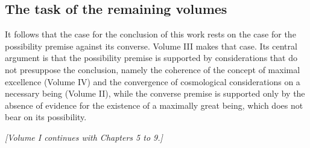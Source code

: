 \documentclass{situationist-preprint}
\begin{document}
\subsection{The task of the remaining volumes}

It follows that the case for the conclusion of this work rests on the case for the possibility premise against its converse. Volume III makes that case. Its central argument is that the possibility premise is supported by considerations that do not presuppose the conclusion, namely the coherence of the concept of maximal excellence (Volume IV) and the convergence of cosmological considerations on a necessary being (Volume II), while the converse premise is supported only by the absence of evidence for the existence of a maximally great being, which does not bear on its possibility.

\bigskip
\begin{center}\small\itshape [Volume I continues with Chapters 5 to 9.]\end{center}
\end{document}

